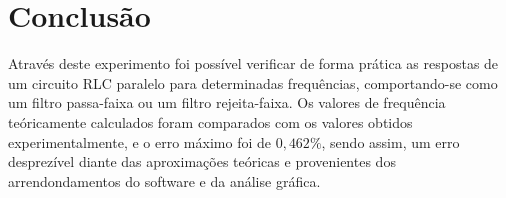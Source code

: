 \newpage
\section{Conclusão}

Através deste experimento foi possível verificar de forma prática as respostas de um circuito RLC paralelo para determinadas frequências, comportando-se como um filtro passa-faixa ou um filtro rejeita-faixa. Os valores de frequência teóricamente calculados foram comparados com os valores obtidos experimentalmente, e o erro máximo foi de $0,462\%$, sendo assim, um erro desprezível diante das aproximações teóricas e provenientes dos arrendondamentos do software e da análise gráfica.

\pagebreak